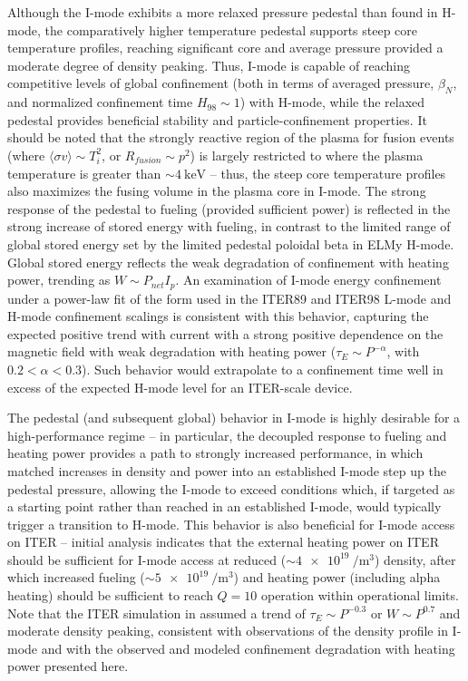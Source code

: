 Although the I-mode exhibits a more relaxed pressure pedestal than found in H-mode, the comparatively higher temperature pedestal supports steep core temperature profiles, reaching significant core and average pressure provided a moderate degree of density peaking.  Thus, I-mode is capable of reaching competitive levels of global confinement (both in terms of averaged pressure, $\beta_N$, and normalized confinement time $H_{98} \sim 1$) with H-mode, while the relaxed pedestal provides beneficial stability and particle-confinement properties.  It should be noted that the strongly reactive region of the plasma for fusion events (where $\langle \sigma v \rangle \sim T_i^2$, or $R_{fusion} \sim p^2$) is largely restricted to where the plasma temperature is greater than $\sim \SI{4}{\kilo\electronvolt}$ -- thus, the steep core temperature profiles also maximizes the fusing volume in the plasma core in I-mode.  The strong response of the pedestal to fueling (provided sufficient power) is reflected in the strong increase of stored energy with fueling, in contrast to the limited range of global stored energy set by the limited pedestal poloidal beta in ELMy H-mode.  Global stored energy reflects the weak degradation of confinement with heating power, trending as $W \sim P_{net} I_p$.  An examination of I-mode energy confinement under a power-law fit of the form used in the ITER89 and ITER98 L-mode and H-mode confinement scalings is consistent with this behavior, capturing the expected positive trend with current with a strong positive dependence on the magnetic field with weak degradation with heating power ($\tau_E \sim P^{-\alpha}$, with $0.2 < \alpha < 0.3$).  Such behavior would extrapolate to a confinement time well in excess of the expected H-mode level for an ITER-scale device.

The pedestal (and subsequent global) behavior in I-mode is highly desirable for a high-performance regime -- in particular, the decoupled response to fueling and heating power provides a path to strongly increased performance, in which matched increases in density and power into an established I-mode step up the pedestal pressure, allowing the I-mode to exceed conditions which, if targeted as a starting point rather than reached in an established I-mode, would typically trigger a transition to H-mode.  This behavior is also beneficial for I-mode access on ITER -- initial analysis \cite{Whyte2011} indicates that the external heating power on ITER should be sufficient for I-mode access at reduced ($\sim \SI{4e19}{\per\meter\cubed}$) density, after which increased fueling ($\sim \SI{5e19}{\per\meter\cubed}$) and heating power (including alpha heating) should be sufficient to reach $Q=10$ operation within operational limits.  Note that the ITER simulation in \cite{Whyte2011} assumed a trend of $\tau_E \sim P^{-0.3}$ or $W \sim P^{0.7}$ and moderate density peaking, consistent with observations of the density profile in I-mode and with the observed and modeled confinement degradation with heating power presented here.\nicechapterending



